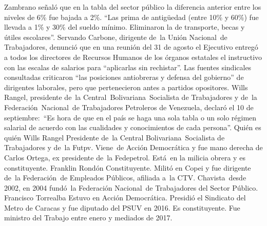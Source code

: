 \documentclass{article}%
\begin{document}
\newline%
%
Zambrano señaló que en la tabla del sector público la diferencia anterior entre los niveles de 6\% fue bajada a 2\%. “Las prima de antigüedad (entre 10\% y 60\%) fue llevada a 1\% y 30\% del sueldo mínimo. Eliminaron la de transporte, becas y útiles escolares”.%
\newline%
%
Servando Carbone, dirigente de~la Unión Nacional~de Trabajadores, denunció que en una reunión del 31 de agosto el Ejecutivo entregó a todos los directores de Recursos Humanos de los órganos estatales el instructivo con las escalas de salarios para “aplicarlas sin rechistar”.%
\newline%
%
Las fuentes sindicales consultadas criticaron “las posiciones antiobreras y defensa del gobierno” de dirigentes laborales, pero que pertenecieron antes a partidos opositores.%
\newline%
%
Wills Rangel, presidente de~la Central~Bolivariana~Socialista de Trabajadores y de~la Federación~Nacional~de Trabajadores Petroleros de Venezuela, declaró el 10 de septiembre:~“Es hora de que en el país se haga una sola tabla o un solo régimen salarial de acuerdo con las cualidades y conocimientos de cada persona”.%
\newline%
%
Quién es quién%
\newline%
%
Wills Rangel%
\newline%
%
Presidente de~la Central Bolivariana~Socialista de Trabajadores y de~la Futpv. Viene~de Acción Democrática y fue mano derecha de Carlos Ortega, ex presidente de~la Fedepetrol. Está~en la milicia obrera y es constituyente.%
\newline%
%
Franklin Rondón%
\newline%
%
Constituyente. Militó en Copei y fue dirigente de~la Federación~de Empleados Públicos, afiliada a~la CTV. Chavista~desde 2002, en 2004 fundó~la Federación Nacional~de Trabajadores del Sector Público.%
\newline%
%
Francisco Torrealba%
\newline%
%
Estuvo en Acción Democrática. Presidió el Sindicato del Metro de Caracas y fue diputado del PSUV en 2016. Es constituyente. Fue ministro del Trabajo entre enero y mediados de 2017.%
\newline%
%
\end{document}
